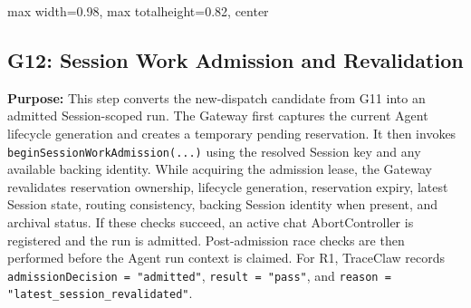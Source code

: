 \begin{center}
\begin{adjustbox}{
max width=0.98\textwidth,
max totalheight=0.82\textheight,
center
}

\end{adjustbox}

\end{center}


\subsection*{G12: Session Work Admission and Revalidation}

\textbf{Purpose:}
This step converts the new-dispatch candidate from G11 into an admitted
Session-scoped run. The Gateway first captures the current Agent
lifecycle generation and creates a temporary pending reservation. It then
invokes \texttt{beginSessionWorkAdmission(...)} using the resolved
Session key and any available backing identity. While acquiring the
admission lease, the Gateway revalidates reservation ownership,
lifecycle generation, reservation expiry, latest Session state, routing
consistency, backing Session identity when present, and archival status.
If these checks succeed, an active chat AbortController is registered and
the run is admitted. Post-admission race checks are then performed before
the Agent run context is claimed. For R1, TraceClaw records
\texttt{admissionDecision = "admitted"},
\texttt{result = "pass"}, and
\texttt{reason = "latest\_session\_revalidated"}.

